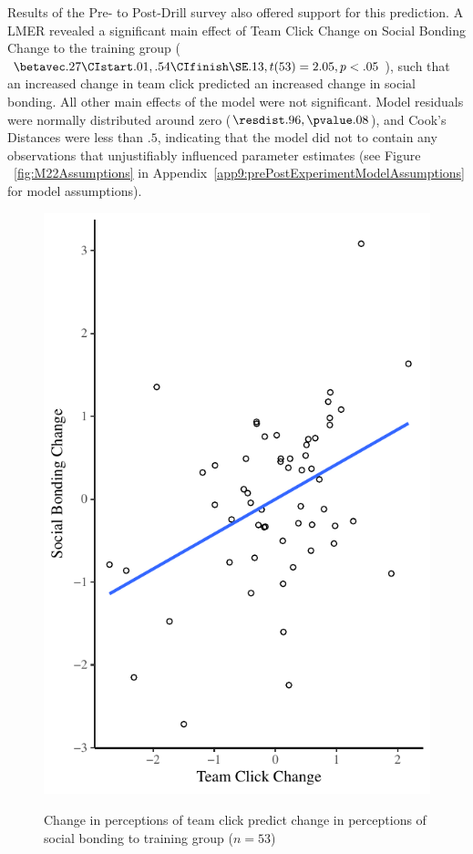 Results of the Pre- to Post-Drill survey also offered support for this prediction.  A LMER revealed a significant main effect of Team Click Change on Social Bonding Change to the training group ($\betavec .27 \CIstart .01, .54 \CIfinish \SE .13, t(53) = 2.05, p < .05$), such that an increased change in team click predicted an increased change in social bonding.  All other main effects of the model were not significant. Model residuals were normally distributed around zero ($\resdist .96, \pvalue .08$), and Cook's Distances were less than $.5$, indicating that the model did not to contain any observations that unjustifiably influenced parameter estimates (see Figure ~\ref{fig:M22Assumptions} in Appendix~\ref{app9:prePostExperimentModelAssumptions} for model assumptions).






\begin{figure}
  \centering
    \includegraphics[width=0.5\linewidth,keepaspectratio] {images/groupClickBondingChangeCondition}
    \label{fig:groupClickBondingChangeCondition}
    \caption{Change in perceptions of team click predict change in perceptions of social bonding to training group ($n = 53$)}
\end{figure}

